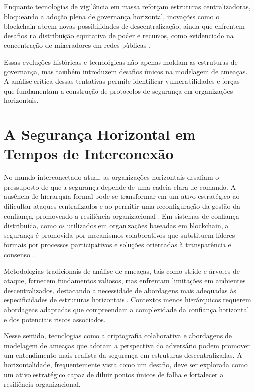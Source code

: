 Enquanto tecnologias de vigilância em massa reforçam estruturas
centralizadoras, bloqueando a adoção plena de governança horizontal,
inovações como o blockchain abrem novas possibilidades de descentralização,
ainda que enfrentem desafios na distribuição equitativa de poder e
recursos, como evidenciado na concentração de mineradores em redes públicas
\cite{DoArtifactsHavePolitics}.

Essas evoluções históricas e tecnológicas não apenas moldam as estruturas
de governança, mas também introduzem desafios únicos na modelagem de
ameaças. A análise crítica dessas tentativas permite identificar
vulnerabilidades e forças que fundamentam a construção de protocolos de
segurança em organizações horizontais.

\section{A Segurança Horizontal em Tempos de Interconexão}
\label{sec:desafios_contemporaneos}

No mundo interconectado atual, as organizações horizontais desafiam o
pressuposto de que a segurança depende de uma cadeia clara de comando. A
ausência de hierarquia formal pode se transformar em um ativo estratégico
ao dificultar ataques centralizados e ao permitir uma reconfiguração da
gestão da confiança, promovendo a resiliência organizacional
\cite{EverydayRevolutions}. Em sistemas de confiança distribuída,
como os utilizados em organizações baseadas em blockchain,
a segurança é promovida por mecanismos colaborativos que
substituem líderes formais por processos participativos e soluções
orientadas à transparência e consenso \cite{Reputation-basedDAO}.

Metodologias tradicionais de análise de ameaças, tais como \gls{stride} e árvores
de ataque, fornecem fundamentos valiosos, mas enfrentam limitações em
ambientes descentralizados, destacando a necessidade de abordagens mais
adequadas às especificidades de estruturas horizontais
\cite{ThreatModellingSurvey}. Contextos menos hierárquicos requerem
abordagens adaptadas que compreendam a complexidade da confiança horizontal
e dos potenciais riscos associados.

Nesse sentido, tecnologias como a criptografia colaborativa \cite{Colbac,
AbcCrypto} e abordagens de modelagem de ameaças que adotam a perspectiva do
adversário podem promover um entendimento mais realista da segurança em
estruturas descentralizadas. A horizontalidade, frequentemente vista como
um desafio, deve ser explorada como um ativo estratégico capaz de diluir
pontos únicos de falha e fortalecer a resiliência organizacional.

